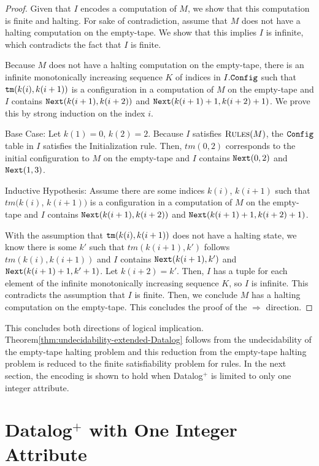 \begin{proof}
\medskip

Given that $I$ encodes a computation of $M$,
we show that this computation is finite and halting. 
For sake of contradiction,
assume that $M$ does not have a halting computation on the empty-tape.
We show that this implies $I$ is infinite,
which contradicts the fact that $I$ is finite.

Because $M$ does not have a halting computation on the empty-tape,
there is an infinite monotonically increasing sequence $K$ of indices in $I.\texttt{Config}$ such that $\texttt{tm}(k(i), k(i+1))$ is a configuration in a computation of $M$ on the empty-tape and $I$ contains $\texttt{Next}(k(i+1), k(i+2))$ and $\texttt{Next}(k(i+1)+1, k(i+2)+1)$.
We prove this by strong induction on the index $i$.

Base Case: Let $k(1)=0$, $k(2)=2$. Because $I$ satisfies $\textsc{Rules}(M)$, the $\texttt{Config}$ table in $I$ satisfies the Initialization rule. Then, $tm(0,2)$ corresponds to the initial configuration to $M$ on the empty-tape and $I$ contains $\texttt{Next}(0,2)$ and $\texttt{Next}(1, 3)$.

Inductive Hypothesis: Assume there are some indices $k(i)$, $k(i+1)$ such that $tm(k(i)$, $k(i+1))$ is a configuration in a computation of $M$ on the empty-tape and $I$ contains $\texttt{Next}(k(i+1), k(i+2))$ and $\texttt{Next}(k(i+1)+1, k(i+2)+1)$.

With the assumption that $\texttt{tm}(k(i), k(i+1))$ does not have a halting state, 
we know
there is some $k'$ such that $tm(k(i+1), k')$ follows $tm(k(i), k(i+1))$ and $I$ contains $\texttt{Next}(k(i+1), k')$ and $\texttt{Next}(k(i+1)+1, k'+1)$. 
Let $k(i+2) = k'$.
Then, $I$ has a tuple for each element of the infinite monotonically increasing sequence $K$,
so $I$ is infinite.
This contradicts the assumption that $I$ is finite.
Then,
we conclude $M$ has a halting computation on the empty-tape.
This concludes the proof of the $\Rightarrow$ direction.
\end{proof}

This concludes both directions of logical implication.
Theorem\:\ref{thm:undecidability-extended-Datalog}
follows from the undecidability of the empty-tape halting problem
\cite{banitt2010halting}
and this reduction from
the empty-tape halting problem
is reduced to the finite satisfiability problem for rules.
In the next section,
the encoding is shown to hold when
Datalog$^{+}$ is limited to only one integer attribute.

\section{Datalog$^{+}$ with One Integer Attribute}
\label{section:two-attr}

